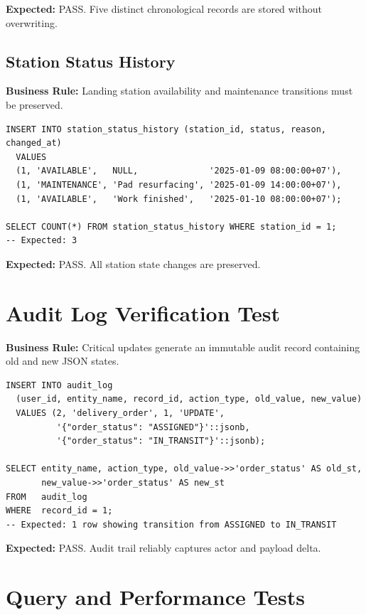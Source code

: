 \textbf{Expected:} PASS. Five distinct chronological records are stored without overwriting.

\subsection{Station Status History}

\textbf{Business Rule:} Landing station availability and maintenance transitions must be preserved.

\begin{verbatim}
INSERT INTO station_status_history (station_id, status, reason, changed_at)
  VALUES
  (1, 'AVAILABLE',   NULL,              '2025-01-09 08:00:00+07'),
  (1, 'MAINTENANCE', 'Pad resurfacing', '2025-01-09 14:00:00+07'),
  (1, 'AVAILABLE',   'Work finished',   '2025-01-10 08:00:00+07');

SELECT COUNT(*) FROM station_status_history WHERE station_id = 1;
-- Expected: 3
\end{verbatim}

\textbf{Expected:} PASS. All station state changes are preserved.

\section{Audit Log Verification Test}\label{s:audittest}

\textbf{Business Rule:} Critical updates generate an immutable audit record containing old and new JSON states.

\begin{verbatim}
INSERT INTO audit_log
  (user_id, entity_name, record_id, action_type, old_value, new_value)
  VALUES (2, 'delivery_order', 1, 'UPDATE',
          '{"order_status": "ASSIGNED"}'::jsonb,
          '{"order_status": "IN_TRANSIT"}'::jsonb);

SELECT entity_name, action_type, old_value->>'order_status' AS old_st,
       new_value->>'order_status' AS new_st
FROM   audit_log
WHERE  record_id = 1;
-- Expected: 1 row showing transition from ASSIGNED to IN_TRANSIT
\end{verbatim}

\textbf{Expected:} PASS. Audit trail reliably captures actor and payload delta.

\section{Query and Performance Tests}\label{s:perftests}


